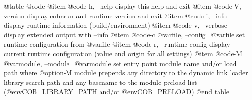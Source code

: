 @table @code
@item @code{-h, --help}
display this help and exit
@item @code{-V, --version}
display cobcrun and runtime version and exit
@item @code{-i, --info}
display runtime information (build/environment)
@item @code{-v, --verbose}
display extended output with --info
@item @code{-c @var{file}, --config=@var{file}}
set runtime configuration from @var{file}
@item @code{-r, --runtime-config}
display current runtime configuration
(value and origin for all settings)
@item @code{-M @var{module}, --module=@var{module}}
set entry point module name and/or load path
where @option{-M} module prepends any directory to the
dynamic link loader library search path
and any basename to the module preload list
(@env{COB_LIBRARY_PATH} and/or @env{COB_PRELOAD})
@end table

